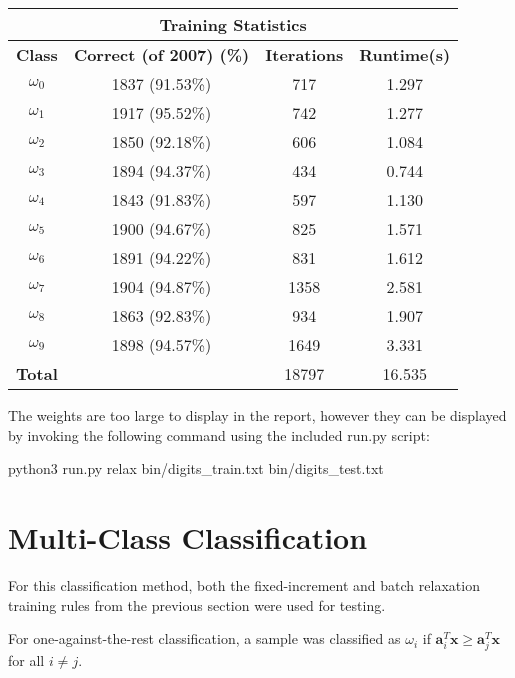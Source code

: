 \documentclass{article}
\newcommand{\mbf}[1]{\ensuremath{\mathbf{#1}}}
\begin{document}
\begin{center}
\begin{tabular}{|c|c|c|c|}
\hline\multicolumn{4}{|c|}{{\bf Training Statistics}}\\
\hline{\bf Class} & {\bf Correct (of 2007) (\%)} & {\bf Iterations} & {\bf Runtime(s)}\\\hline
$\omega_0$ & 1837 (91.53\%) & 717 & 1.297 \\
$\omega_1$ & 1917 (95.52\%) & 742 & 1.277 \\
$\omega_2$ & 1850 (92.18\%) & 606 & 1.084 \\
$\omega_3$ & 1894 (94.37\%) & 434 & 0.744 \\
$\omega_4$ & 1843 (91.83\%) & 597 & 1.130 \\
$\omega_5$ & 1900 (94.67\%) & 825 & 1.571 \\
$\omega_6$ & 1891 (94.22\%) & 831 & 1.612 \\
$\omega_7$ & 1904 (94.87\%) & 1358 & 2.581 \\
$\omega_8$ & 1863 (92.83\%) & 934 & 1.907 \\
$\omega_9$ & 1898 (94.57\%) & 1649 & 3.331 \\
\hline
{\bf Total} & ~ & 18797 & 16.535\\
\hline
\end{tabular}
\end{center}

The weights are too large to display in the report, however they can be displayed by invoking the following command using the included run.py script:
\begin{center}
python3 run.py relax bin/digits\_train.txt bin/digits\_test.txt
\end{center}

\section{Multi-Class Classification}
For this classification method, both the fixed-increment and batch relaxation training rules from the previous section were used for testing.

For one-against-the-rest classification, a sample was classified as $\omega_i$ if $\mbf{a}^T_i \mbf{x} \geq \mbf{a}^T_j \mbf{x}$ for all $i \neq j$.
\end{document}
